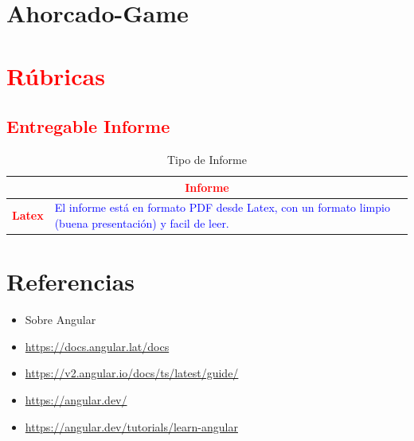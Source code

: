 \documentclass{article}
\begin{document}
	\section{Ahorcado-Game}
	
	
	





\clearpage

	\section{\textcolor{red}{Rúbricas}}
	
	\subsection{\textcolor{red}{Entregable Informe}}
	\begin{table}[H]
		\caption{Tipo de Informe}
		\setlength{\tabcolsep}{0.5em} %
		{\renewcommand{\arraystretch}{1.5}%
		\begin{tabular}{|p{3cm}|p{12cm}|}
			\hline
			\multicolumn{2}{|c|}{\textbf{\textcolor{red}{Informe}}}  \\
			\hline 
			\textbf{\textcolor{red}{Latex}} & \textcolor{blue}{El informe está en formato PDF desde Latex,  con un formato limpio (buena presentación) y facil de leer.}   \\ 
			\hline 
			
			
		\end{tabular}
	}
	\end{table}
	
	\clearpage
	
	
	
\clearpage

\section{Referencias}
\begin{itemize}			
	\item Sobre Angular
	\item \url{https://docs.angular.lat/docs}
	\item \url{https://v2.angular.io/docs/ts/latest/guide/}
	\item \url{https://angular.dev/}
	\item \url{https://angular.dev/tutorials/learn-angular}
\end{itemize}	
	
%
%
%
\end{document}
